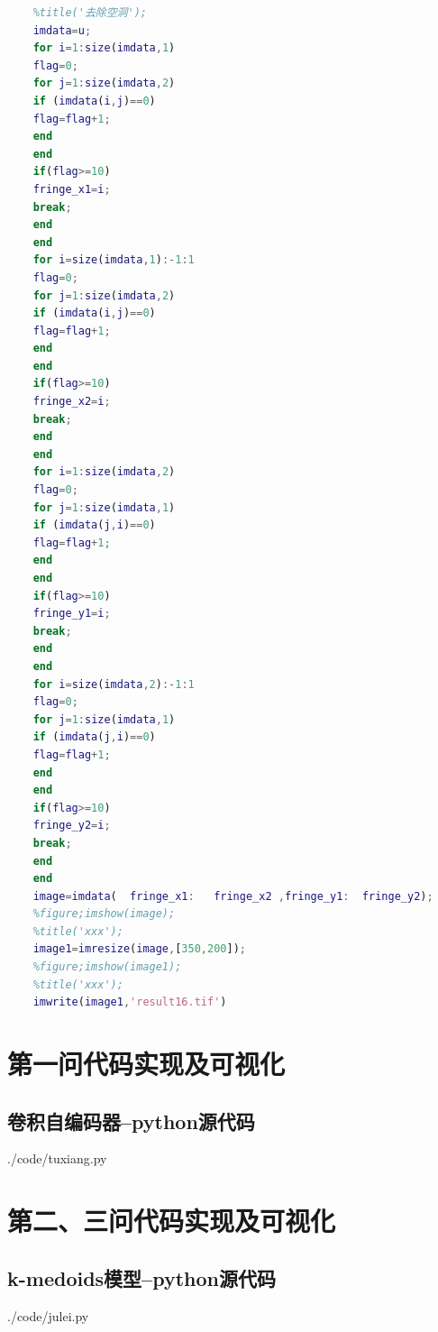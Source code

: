 \documentclass{whutmod}
\begin{document}
\begin{lstlisting}[language=matlab]
	%figure;imshow(u);
	%title('去除空洞');
	imdata=u;
	for i=1:size(imdata,1)
	flag=0;
	for j=1:size(imdata,2)
	if (imdata(i,j)==0)
	flag=flag+1;
	end
	end
	if(flag>=10)
	fringe_x1=i;
	break;
	end
	end
	for i=size(imdata,1):-1:1
	flag=0;
	for j=1:size(imdata,2)
	if (imdata(i,j)==0)
	flag=flag+1;
	end
	end
	if(flag>=10)
	fringe_x2=i;
	break;
	end
	end
	for i=1:size(imdata,2)
	flag=0;
	for j=1:size(imdata,1)
	if (imdata(j,i)==0)
	flag=flag+1;
	end
	end
	if(flag>=10)
	fringe_y1=i;
	break;
	end
	end
	for i=size(imdata,2):-1:1
	flag=0;
	for j=1:size(imdata,1)
	if (imdata(j,i)==0)
	flag=flag+1;
	end
	end
	if(flag>=10)
	fringe_y2=i;
	break;
	end
	end
	image=imdata(  fringe_x1:   fringe_x2 ,fringe_y1:  fringe_y2);
	%figure;imshow(image);
	%title('xxx');
	image1=imresize(image,[350,200]);
	%figure;imshow(image1);
	%title('xxx');
	imwrite(image1,'result16.tif')

	\end{lstlisting}
	\section{第一问代码实现及可视化}
		\subsection*{卷积自编码器--python源代码}
			 {./code/tuxiang.py}
	\section{第二、三问代码实现及可视化}
\subsection*{k-medoids模型--python源代码}
 {./code/julei.py}
\end{document}
